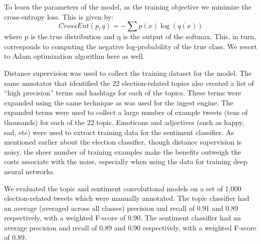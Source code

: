 \documentclass[letterpaper]{article}
\begin{document}
To learn the parameters of the model, as the training objective we minimize the cross-entropy loss. This is given by:
\begin{equation}\label{cat_ce} CrossEnt(p,q)=-\sum p(x)\log(q(x))\end{equation}
where p is the true distribution and q is the output of the softmax. This, in turn, corresponds to computing the negative log-probability of the true class. We resort to Adam optimization algorithm \cite{kingma2014adam} here as well.

Distance supervision was used to collect the training dataset for the model. The same annotator that identified the 22 election-related topics also created a list of ``high precision'' terms and hashtags for each of the topics. These terms were expanded using the same technique as was used for the ingest engine. The expanded terms were used to collect a large number of example tweets (tens of thousands) for each of the 22 topic. Emoticons and adjectives (such as happy, sad, etc) were used to extract training data for the sentiment classifier. As mentioned earlier about the election classifier, though distance supervision is noisy, the sheer number of training examples make the benefits outweigh the costs associate with the noise, especially when using the data for training deep neural networks.

We evaluated the topic and sentiment convolutional models on a set of 1,000 election-related tweets which were manually annotated. The topic classifier had an average (averaged across all classes) precision and recall of 0.91 and 0.89 respectively, with a weighted F-score of 0.90. The sentiment classifier had an average precision and recall of 0.89 and 0.90 respectively, with a weighted F-score of 0.89.
\end{document}
